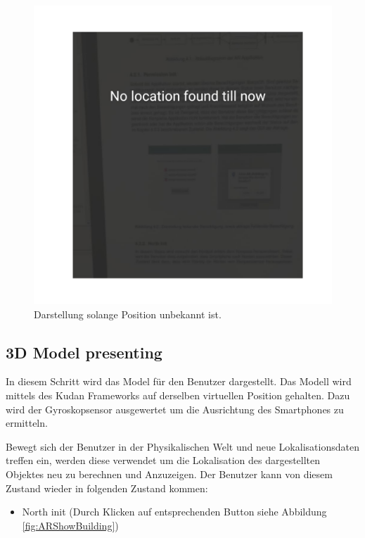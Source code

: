\documentclass[a4paper]{scrreprt}
\begin{document}
\begin{figure}[h!]
	\includegraphics[keepaspectratio, width=\textwidth]{UnknownLocation.png}
	\caption{Darstellung solange Position unbekannt ist.}
    \label{fig:KoordinationNotFound}
\end{figure}


\subsection{3D Model presenting} \label{ch:ThreeDModelPresenting}
In diesem Schritt wird das Model für den Benutzer dargestellt. Das Modell wird mittels des Kudan Frameworks auf derselben virtuellen Position gehalten. Dazu wird der Gyroskopsensor ausgewertet um die Ausrichtung des Smartphones zu ermitteln.

Bewegt sich der Benutzer in der Physikalischen Welt und neue Lokalisationsdaten treffen ein, werden diese verwendet um die Lokalisation des dargestellten Objektes neu zu berechnen und Anzuzeigen. 
Der Benutzer kann von diesem Zustand wieder in folgenden Zustand kommen:

\begin{itemize}
	\item North init (Durch Klicken auf entsprechenden Button siehe Abbildung \ref{fig:ARShowBuilding})
\end{itemize}
\end{document}
